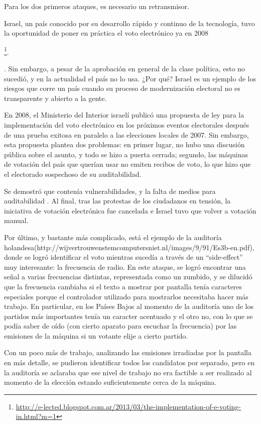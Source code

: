 Para los dos primeros ataques, es necesario un retransmisor.

Israel, un país conocido por su desarrollo rápido y continuo de la tecnología, tuvo la oportunidad de poner en práctica el voto electrónico ya en 2008

\footnote{\url{http://e-lected.blogspot.com.ar/2013/03/the-implementation-of-e-voting-in.html?m=1}}.

. Sin embargo, a pesar de la aprobación en general de la clase política, esto no sucedió, y en la actualidad el país no lo usa. ¿Por qué? Israel es un ejemplo de los riesgos que corre un país cuando su proceso de modernización electoral no es transparente y abierto a la gente.

En 2008, el Ministerio del Interior israelí publicó una propuesta de ley para la implementación del voto electrónico en los próximos eventos electorales después de una prueba exitosa en paralelo a las elecciones locales de 2007. Sin embargo, esta propuesta plantea dos problemas: en primer lugar, no hubo una discusión pública sobre el asunto, y todo se hizo a puerta cerrada; segundo, las máquinas de votación del país que querían usar no emiten recibos de voto, lo que hizo que el electorado sospechoso de su auditabilidad.

Se demostró que contenía vulnerabilidades, y la falta de medios para auditabilidad .
Al final, tras las protestas de los ciudadanos en tensión, la iniciativa de votación electrónica fue cancelada e Israel tuvo que volver a votación manual.


Por último, y bastante más complicado, está el ejemplo de la auditoría holandesa(http://wijvertrouwenstemcomputersniet.nl/images/9/91/Es3b-en.pdf), donde se logró identificar el voto mientras sucedía a través de un ``side-effect'' muy interesante: la frecuencia de radio. En este ataque, se logró encontrar una señal a varias frecuencias distintas, representada como un zumbido, y se dilucidó que la frecuencia cambiaba si el texto a mostrar por pantalla tenía caracteres especiales porque el controlador utilizado para mostrarlos necesitaba hacer más trabajo. En particular, en los Países Bajos al momento de la auditoría uno de los partidos más importantes tenía un caracter acentuado y el otro no, con lo que se podía saber de oído (con cierto aparato para escuchar la frecuencia) por las emisiones de la máquina si un votante elije a cierto partido.

Con un poco más de trabajo, analizando las emisiones irradiadas por la pantalla en más detalle, se pudieron identificar todos los candidatos por separado, pero en la auditoría se aclaraba que ese nivel de trabajo no era factible a ser realizado al momento de la elección estando suficientemente cerca de la máquina.
